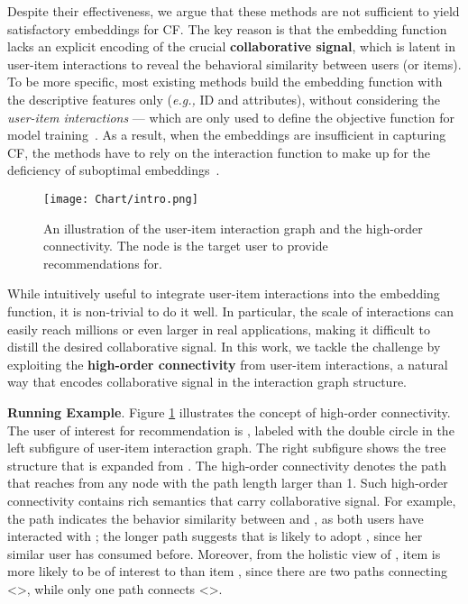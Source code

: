 \documentclass[sigconf]{acmart}
\newcommand{\eg}{\emph{e.g., }}
\theoremstyle{definition}
\begin{document}
Despite their effectiveness, we argue that these methods are not sufficient to yield 
satisfactory embeddings for CF. The key reason is that the embedding function lacks an explicit encoding of the crucial \textbf{collaborative signal}, which is latent in user-item interactions to reveal the behavioral similarity between users (or items). To be more specific, most existing methods build the embedding function with the descriptive features only (\eg ID and attributes), 
without considering the
\textit{user-item interactions} --- which are only used to define the objective function for model training~\cite{BPRMF,tay2018latent}. 
As a result, when the embeddings are insufficient in capturing CF, the methods have to rely on the interaction function to make up for the deficiency of suboptimal embeddings~\cite{NCF}. 

\begin{figure}[t]
    \centering
	\texttt{[image: Chart/intro.png]}
	\vspace{-10pt}
	\caption{An illustration of the user-item interaction graph and the high-order connectivity. The node  is the target user to provide recommendations for.}
	\label{fig:intro}
	\vspace{-15pt}
\end{figure}

While intuitively useful to integrate user-item interactions into the embedding function, it is non-trivial to do it well. In particular, the scale of interactions can easily reach millions or even larger in real applications, making it difficult to distill the desired collaborative signal. 
In this work, we tackle the challenge by exploiting the \textbf{high-order connectivity} from user-item interactions, a natural way that encodes collaborative signal in the interaction graph structure.


\vspace{+5pt}
\noindent\textbf{Running Example}. Figure \ref{fig:intro} illustrates the concept of high-order connectivity. The user of interest for recommendation is , labeled with the double circle in the left subfigure of user-item interaction graph. The right subfigure shows the tree structure that is expanded from . The high-order connectivity denotes the path that reaches  from any node with the path length  larger than 1. Such high-order connectivity contains rich semantics that carry collaborative signal. 
For example, the path  indicates the behavior similarity between  and , as both users have interacted with ; the longer path  suggests that  is likely to adopt , since her similar user  has consumed  before. Moreover, from the holistic view of , item  is more likely to be of interest to  than item , since there are two paths connecting <>, while only one path connects <>.
\end{document}
